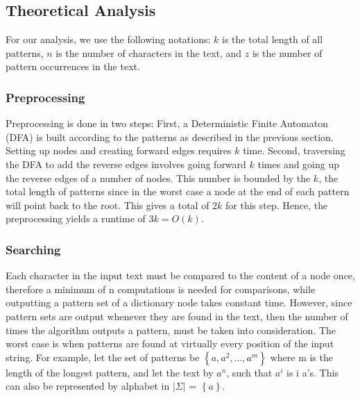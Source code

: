 \documentclass[paper=a4, fontsize=11pt]{scrartcl} %
\numberwithin{equation}{section} %
\numberwithin{figure}{section} %
\numberwithin{table}{section} %
\begin{document}
\subsection{Theoretical Analysis}
For our analysis, we use the following notations: $k$ is the total length of all patterns, $n$ is the number of characters in the text, and $z$ is the number of pattern occurrences in the text.

\subsubsection{Preprocessing}
Preprocessing is done in two steps:
First, a Deterministic Finite Automaton (DFA) is built according to the patterns as described in the previous section. Setting up nodes and creating forward edges requires $k$ time.
Second, traversing the DFA to add the reverse edges involves going forward $k$ times and going up the reverse edges of a number of nodes. This number is bounded by the $k$, the total length of patterns since in the worst case a node at the end of each pattern will point back to the root. This gives a total of $2k$ for this step. Hence, the preprocessing yields a runtime of  $3k = O(k)$. 

\subsubsection{Searching}
Each character in the input text must be compared to the content of a node once, therefore a minimum of n computations is needed for comparisons, while outputting a pattern set of a dictionary node takes constant time. However, since pattern sets are output whenever they are found in the text, then the number of times the algorithm outputs a pattern, must be taken into consideration. The worst case is when patterns are found at virtually every position of the input string. For example, let the set of patterns be $\left\{a, a^2,\dots, a^m\right\}$ where m is the length of the longest pattern, and let the text by $a^n$, such that $a^i$ is i a's. This can also be represented by alphabet in $|\Sigma|$ = $\left\{a\right\}$.
\end{document}

